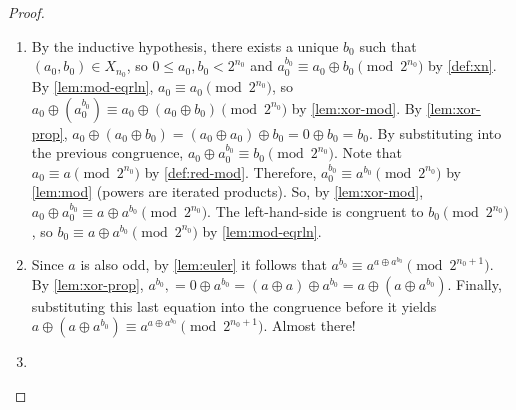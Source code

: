 \documentclass[1gpt]{article}
\theoremstyle{break}
\newcommand{\xor}{\oplus}
\begin{document}
\begin{proof}
\begin{enumerate}
            \begin{enumerate}

                \item

                    By the inductive hypothesis, there exists a unique $b_0$
                    such that $(a_0, b_0) \in X_{n_0}$, so $0 \leq a_0, b_0 <
                    2^{n_0}$ and $a_0^{b_0} \equiv a_0 \xor b_0 \pmod{2^{n_0}}$
                    by \ref{def:xn}. By \ref{lem:mod-eqrln}, $a_0 \equiv a_0
                    \pmod{2^{n_0}}$, so $a_0 \xor (a_0^{b_0}) \equiv a_0 \xor
                    (a_0 \xor b_0) \pmod{2^{n_0}}$ by \ref{lem:xor-mod}. By
                    \ref{lem:xor-prop}, $a_0 \xor (a_0 \xor b_0) = (a_0 \xor
                    a_0) \xor b_0 = 0 \xor b_0 = b_0$. By substituting into the
                    previous congruence, $a_0 \xor a_0^{b_0} \equiv b_0
                    \pmod{2^{n_0}}$. Note that $a_0 \equiv a \pmod{2^{n_0}}$ by
                    \ref{def:red-mod}. Therefore, $a_0^{b_0} \equiv a^{b_0}
                    \pmod{2^{n_0}}$ by \ref{lem:mod} (powers are iterated
                    products). So, by \ref{lem:xor-mod}, $a_0 \xor a_0^{b_0}
                    \equiv a \xor a^{b_0} \pmod{2^{n_0}}$. The left-hand-side
                    is congruent to $b_0 \pmod{2^{n_0}}$, so $b_0 \equiv a \xor
                    a^{b_0} \pmod{2^{n_0}}$ by \ref{lem:mod-eqrln}.

                \item

                    \label{step:odd-a-exis-b} Since $a$ is also odd, by
                    \ref{lem:euler} it follows that $a^{b_0} \equiv a^{a \xor
                    a^{b_0}} \pmod{2^{n_0+1}}$. By \ref{lem:xor-prop}, $a^{b_0}
                    ,= 0 \xor a^{b_0} = (a \xor a) \xor a^{b_0} = a \xor (a
                    \xor a^{b_0})$. Finally, substituting this last equation
                    into the congruence before it yields $a \xor (a \xor
                    a^{b_0}) \equiv a^{a \xor a^{b_0}} \pmod{2^{n_0+1}}$.
                    Almost there!

                \item


\end{enumerate}
\end{enumerate}
\end{proof}
\end{document}
